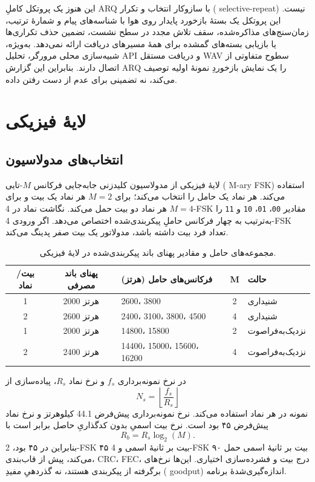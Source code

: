 \documentclass[12pt,a4paper]{article}
\providecommand{\lr}[1]{\foreignlanguage{english}{\begingroup\hyphenchar\font=-1 #1\endgroup}}
\newcommand{\code}[1]{\lr{\texttt{#1}}}
\begin{document}
این هنوز یک پروتکل کاملِ \lr{ARQ} با سازوکار انتخاب و تکرار (\lr{selective-repeat}) نیست. این پروتکل یک بستۀ بازخورد پایدار روی هوا با شناسه‌های پیام و شمارۀ ترتیب، زمان‌سنج‌های مذاکره‌شده، سقف تلاش مجدد در سطح نشست، تضمین حذف تکراری‌ها یا بازیابی بسته‌های گمشده برای همۀ مسیرهای دریافت ارائه نمی‌دهد. به‌ویژه، شبیه‌سازی محلی مرورگر، تحلیل \lr{API} و دریافت مستقل \lr{WAV} سطوح متفاوتی از اتصال دارند. بنابراین این گزارش \lr{ARQ} را یک نمایش بازخوردِ نمونۀ اولیه توصیف می‌کند، نه تضمینی برای عدم از دست رفتن داده.

\section{لایۀ فیزیکی}
\label{sec:phy}

\subsection{انتخاب‌های مدولاسیون}
لایۀ فیزیکی از مدولاسیون کلیدزنی جابه‌جایی فرکانس $M$-تایی (\lr{M-ary FSK}) استفاده می‌کند. هر نماد یک حامل را انتخاب می‌کند؛ برای $M=2$ هر نماد یک بیت و برای $M=4$ هر نماد دو بیت حمل می‌کند. نگاشت نماد در \lr{4-FSK} مقادیر \code{00}، \code{01}، \code{10} و \code{11} را به‌ترتیب به چهار فرکانس حاملِ پیکربندی‌شده اختصاص می‌دهد. اگر ورودی \lr{4-FSK} تعداد فرد بیت داشته باشد، مدولاتور یک بیت صفر پدینگ می‌کند.

\begin{table}[ht]
\centering
\begin{tabularx}{\textwidth}{@{}ccXcl@{}}
\toprule
\textbf{بیت/نماد} & \textbf{پهنای باند مصرفی} & \textbf{فرکانس‌های حامل (هرتز)} & \textbf{\lr{M}} & \textbf{حالت}\\
\midrule
1 & 2000 هرتز & 2600، 3800 & 2 & شنیداری\\
2 & 2600 هرتز & 2400، 3100، 3800، 4500 & 4 & شنیداری\\
1 & 2000 هرتز & 14800، 15800 & 2 & نزدیک‌به‌فراصوت\\
2 & 2400 هرتز & 14400، 15000، 15600، 16200 & 4 & نزدیک‌به‌فراصوت\\
\bottomrule
\end{tabularx}
\caption{مجموعه‌های حامل و مقادیر پهنای باند پیکربندی‌شده در لایۀ فیزیکی.}
\label{tab:tones}
\end{table}

در نرخ نمونه‌برداری $f_s$ و نرخ نماد $R_s$، پیاده‌سازی از
\[
    N_s=\left\lfloor\frac{f_s}{R_s}\right\rfloor
\]
نمونه در هر نماد استفاده می‌کند. نرخ نمونه‌برداری پیش‌فرض \lr{44.1} کیلوهرتز و نرخ نماد پیش‌فرض ۴۵ بود است. نرخ بیت اسمیِ بدون کدگذاریِ حاصل برابر است با
\[
    R_b=R_s\log_2(M).
\]
بنابراین در ۴۵ بود، \lr{2-FSK} ۴۵ بیت بر ثانیۀ اسمی و \lr{4-FSK} ۹۰ بیت بر ثانیۀ اسمی حمل می‌کند، پیش از قاب‌بندی، \lr{CRC}، \lr{FEC}، درج بیت و فشرده‌سازی اختیاری. این‌ها نرخ‌های برگرفته از پیکربندی هستند، نه گذردهیِ مفیدِ (\lr{goodput}) اندازه‌گیری‌شدۀ برنامه.
\end{document}
